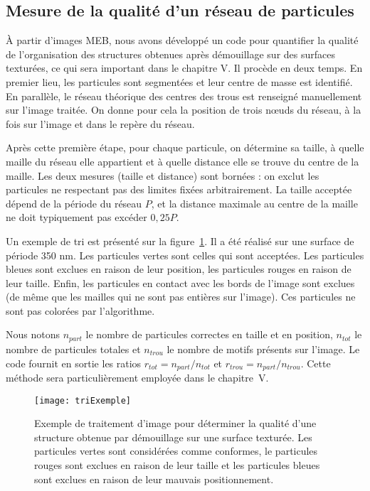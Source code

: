 	\subsection{Mesure de la qualité d'un réseau de particules}
À partir d'images MEB, nous avons développé un code pour quantifier la qualité de l'organisation des structures obtenues après démouillage sur des surfaces texturées, ce qui sera important dans le chapitre V. Il procède en deux temps. En premier lieu, les particules sont segmentées et leur centre de masse est identifié. En parallèle, le réseau théorique des centres des trous est renseigné manuellement sur l'image traitée. On donne pour cela la position de trois nœuds du réseau, à la fois sur l'image et dans le repère du réseau.\par 
Après cette première étape, pour chaque particule, on détermine sa taille, à quelle maille du réseau elle appartient et à quelle distance elle se trouve du centre de la maille. Les deux mesures (taille et distance) sont bornées : on exclut les particules ne respectant pas des limites fixées arbitrairement. La taille acceptée dépend de la période du réseau $P$, et la distance maximale au centre de la maille ne doit typiquement pas excéder $0,25P$.\par 
Un exemple de tri est présenté sur la figure~\ref{triExemple}. Il a été réalisé sur une surface de période 350 nm. Les particules vertes sont celles qui sont acceptées. Les particules bleues sont exclues en raison de leur position, les particules rouges en raison de leur taille. Enfin, les particules en contact avec les bords de l'image sont exclues (de même que les mailles qui ne sont pas entières sur l'image). Ces particules ne sont pas colorées par l'algorithme.\par 
Nous notons $n_{part}$ le nombre de particules correctes en taille et en position, $n_{tot}$ le nombre de particules totales et $n_{trou}$ le nombre de motifs présents sur l'image. Le code fournit en sortie les ratios $r_{tot} = n_{part}/n_{tot}$ et $r_{trou} = n_{part}/n_{trou}$. Cette méthode sera particulièrement employée dans le chapitre~V.\par 
\begin{figure}[!htb]
\centering
\texttt{[image: triExemple]}
\caption{Exemple de traitement d'image pour déterminer la qualité d'une structure obtenue par démouillage sur une surface texturée. Les particules vertes sont considérées comme conformes, le particules rouges sont exclues en raison de leur taille et les particules bleues sont exclues en raison de leur mauvais positionnement.}
\label{triExemple}
\end{figure}

